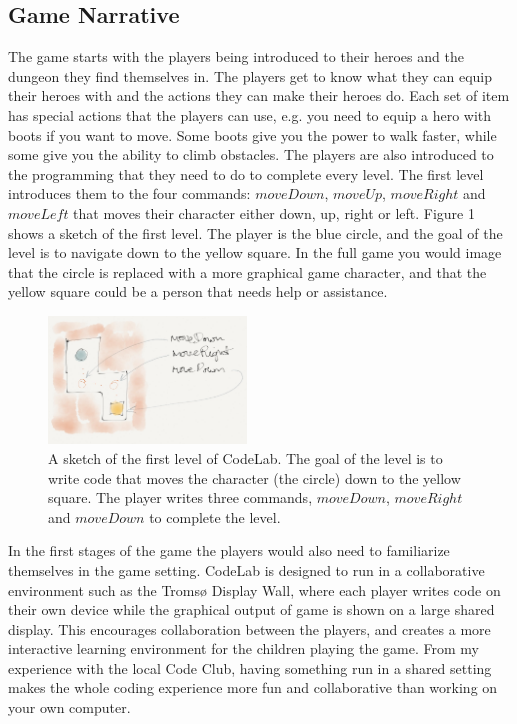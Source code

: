 \documentclass[12pt,journal,compsoc]{IEEEtran}
\begin{document}
\subsection{Game Narrative} 
The game starts with the players being introduced to their heroes and the
dungeon they find themselves in. The players get to know what they can equip
their heroes with and the actions they can make their heroes do. Each set of
item has special actions that the players can use, e.g. you need to equip a hero
with boots if you want to move. Some boots give you the power to walk faster,
while some give you the ability to climb obstacles. The players are also
introduced to the programming that they need to do to complete every level. The
first level introduces them to the four commands: $moveDown$, $moveUp$,
$moveRight$ and $moveLeft$ that moves their character either down, up, right or
left. Figure 1 shows a sketch of the first level. The player is the blue
circle, and the goal of the level is to navigate down to the yellow square.
In the full game you would image that the circle is replaced with a more
graphical game character, and that the yellow square could be a person that
needs help or assistance. 

\begin{figure}[htb]
    \begin{centering}
    \includegraphics[width=0.47\textwidth]{./figures/codelab3.png}
    \caption{A sketch of the first level of CodeLab. The goal of the level
    is to write code that moves the character (the circle) down to the
    yellow square. The player writes three commands, $moveDown$,
    $moveRight$ and $moveDown$ to complete the level. } 
    \label{fig:level1}
    \end{centering} 
\end{figure}


In the first stages of the game the players would also need to familiarize
themselves in the game setting. CodeLab is designed to run in a collaborative
environment such as the Tromsø Display Wall, where each player writes code on
their own device while the graphical output of game is shown on a large shared
display. This encourages collaboration between the players, and creates a more
interactive learning environment for the children playing the game. From my
experience with the local Code Club, having something run in a shared setting
makes the whole coding experience more fun and collaborative than working on
your own computer. 
\end{document}
